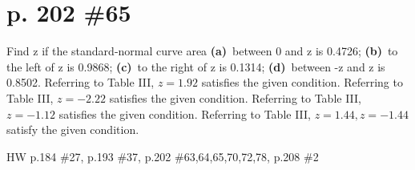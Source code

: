 \documentclass[12pt]{article}
\begin{document}
	\section[20pt]{p. 202 \#65}
	Find z if the standard-normal curve area \newline
	\textbf{(a)}\ between 0 and z is 0.4726; \newline
	\textbf{(b)}\ to the left of z is 0.9868; \newline
	\textbf{(c)}\ to the right of z is 0.1314; \newline
	\textbf{(d)}\ between -z and z is 0.8502. \newline
	\newline
	Referring to Table III, \(z=1.92\) satisfies the given condition. \newline
	 \newline \newline
	Referring to Table III, \(z=-2.22\) satisfies the given condition. \newline
	 \newline \newline
	Referring to Table III, \(z=-1.12\) satisfies the given condition. \newline
	 \newline \newline
	Referring to Table III, \(z=1.44,z=-1.44\) satisfy the given condition. \newline
	\newpage
	\maketitle HW p.184 \#27, p.193 \#37, p.202 \#63,64,65,70,72,78, p.208 \#2
\end{document}
